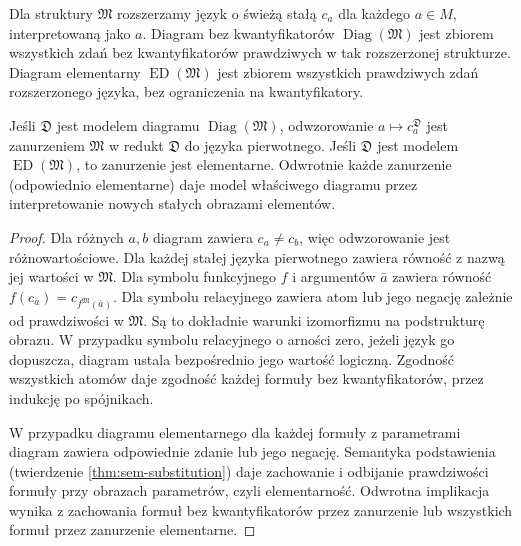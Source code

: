 \begin{definicja}
\label{def:mod-mc-diagrams}
Dla struktury $\mathfrak M$ rozszerzamy język o świeżą
stałą $c_a$ dla każdego $a\in M$, interpretowaną jako $a$.
Diagram bez kwantyfikatorów $\operatorname{Diag}(\mathfrak M)$
jest zbiorem wszystkich zdań bez kwantyfikatorów
prawdziwych w tak rozszerzonej strukturze.
Diagram elementarny $\operatorname{ED}(\mathfrak M)$
jest zbiorem wszystkich prawdziwych zdań rozszerzonego
języka, bez ograniczenia na kwantyfikatory.
\end{definicja}

\begin{lemat}
\label{lem:mod-mc-diagram-embedding}
Jeśli $\mathfrak D$ jest modelem diagramu
$\operatorname{Diag}(\mathfrak M)$, odwzorowanie
$a\mapsto c_a^{\mathfrak D}$ jest zanurzeniem
$\mathfrak M$ w redukt $\mathfrak D$ do języka pierwotnego.
Jeśli $\mathfrak D$ jest modelem
$\operatorname{ED}(\mathfrak M)$, to zanurzenie
jest elementarne. Odwrotnie każde zanurzenie
(odpowiednio elementarne) daje model właściwego diagramu
przez interpretowanie nowych stałych obrazami elementów.
\end{lemat}
\begin{proof}
Dla różnych $a,b$ diagram zawiera $c_a\ne c_b$,
więc odwzorowanie jest różnowartościowe. Dla każdej
stałej języka pierwotnego zawiera równość z nazwą
jej wartości w $\mathfrak M$. Dla symbolu funkcyjnego
$f$ i argumentów $\bar a$ zawiera równość
$f(c_{\bar a})=c_{f^{\mathfrak M}(\bar a)}$.
Dla symbolu relacyjnego zawiera atom lub jego negację
zależnie od prawdziwości w $\mathfrak M$. Są to dokładnie
warunki izomorfizmu na podstrukturę obrazu.
W przypadku symbolu relacyjnego o arności zero,
jeżeli język go dopuszcza, diagram ustala bezpośrednio
jego wartość logiczną. Zgodność wszystkich atomów
daje zgodność każdej formuły bez kwantyfikatorów,
przez indukcję po spójnikach.

W przypadku diagramu elementarnego dla każdej
formuły z parametrami diagram zawiera odpowiednie
zdanie lub jego negację. Semantyka podstawienia
(twierdzenie \ref{thm:sem-substitution}) daje zachowanie
i odbijanie prawdziwości formuły przy obrazach parametrów,
czyli elementarność.
Odwrotna implikacja wynika z zachowania formuł bez
kwantyfikatorów przez zanurzenie lub wszystkich
formuł przez zanurzenie elementarne.
\end{proof}

